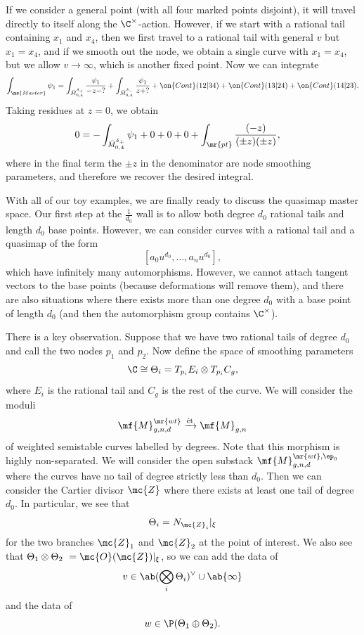 \begin{exm}
    If we consider a general point (with all four marked points disjoint), it will travel directly to itself along the \(\C^{\times}\)-action. However, if we start with a rational tail containing \(x_1\) and \(x_4\), then we first travel to a rational tail with general \(v\) but \(x_1 = x_4\), and if we smooth out the node, we obtain a single curve with \(x_1 = x_4\), but we allow \(v \to \infty\), which is another fixed point. Now we can integrate
    \begin{align*}
        \int_{\ms{Master}} \psi_1 = \int_{\bar{M}_{0,4}^{\delta_+}} \frac{\psi_1}{-z-?} + \int_{\bar{M}_{0,4}^{\delta_-}} \frac{\psi_1}{z+?} + \on{Cont}(12|34) + \on{Cont}(13|24) + \on{Cont}(14|23).
    \end{align*}
    Taking residues at \(z = 0\), we obtain
    \begin{align*}
        0 &= - \int_{\bar{M}_{0,4}^{\delta_+}} \psi_1 + 0 + 0 + 0 + \int_{\mr{pt}} \frac{(-z)}{(\pm z)(\pm z)},
    \end{align*}
    where in the final term the \(\pm z\) in the denominator are node smoothing parameters, and therefore we recover the desired integral.
\end{exm}

With all of our toy examples, we are finally ready to discuss the quasimap master space. Our first step at the \(\frac{1}{d_0}\) wall is to allow both degree \(d_0\) rational tails and length \(d_0\) base points. However, we can consider curves with a rational tail and a quasimap of the form
\[ [a_0 u^{d_0}, \ldots, a_n u^{d_0}], \]
which have infinitely many automorphisms. However, we cannot attach tangent vectors to the base points (because deformations will remove them), and there are also situations where there exists more than one degree \(d_0\) with a base point of length \(d_0\) (and then the automorphism group contains \(\C^{\times}\)).

\begin{rmk}
    There is a key observation. Suppose that we have two rational tails of degree \(d_0\) and call the two nodes \(p_1\) and \(p_2\). Now define the space of smoothing parameters
    \[ \C \cong \Theta_i = T_{p_i} E_i \otimes T_{p_i} C_g, \]
    where \(E_i\) is the rational tail and \(C_g\) is the rest of the curve. We will consider the moduli
    \[ \mf{M}_{g,n,d}^{\mr{wt}} \xrightarrow{\text{\'et}} \mf{M}_{g,n} \]
    of weighted semistable curves labelled by degrees. Note that this morphism is highly non-separated. We will consider the open substack \(\mf{M}_{g,n,d}^{\mr{wt}, \ep_0}\) where the curves have no tail of degree strictly less than \(d_0\). Then we can consider the Cartier divisor \(\mc{Z}\) where there exists at least one tail of degree \(d_0\). In particular, we see that
    \[ \Theta_i = N_{\mc{Z}_i} |_{\xi} \]
    for the two branches \(\mc{Z}_1\) and \(\mc{Z}_2\) at the point of interest. We also see that \(\Theta_1 \otimes \Theta_2\ = \mc{O}(\mc{Z})|_{\xi}\), so we can add the data of
    \[ v \in \ab(\bigotimes_i \Theta_i)^{\vee} \cup \ab\{\infty\} \]
    and the data of 
    \[ w \in \P(\Theta_1 \oplus\Theta_2). \]
\end{rmk}

